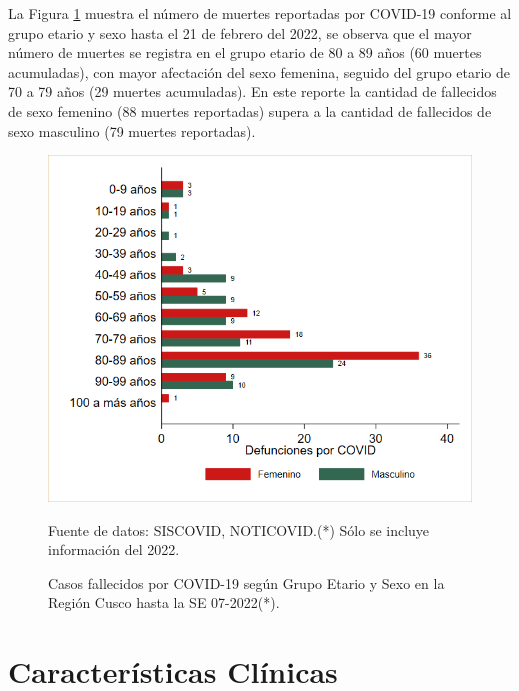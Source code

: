\documentclass[12pt,a4paper,openany]{book}
\begin{document}
La Figura \ref{fig:fallecidos_edad_sexo}  muestra el número de muertes reportadas por COVID-19 conforme al grupo etario y sexo hasta el 21 de febrero del 2022, se observa que el mayor número de muertes se registra en el grupo etario de 80 a 89 años (60 muertes acumuladas), con mayor afectación del sexo femenina, seguido del grupo etario de 70 a 79 años (29 muertes acumuladas). En este reporte la cantidad de fallecidos de sexo femenino (88 muertes reportadas) supera a la cantidad de fallecidos de sexo masculino (79 muertes reportadas). 

\begin{figure}[h]
	\caption{Casos fallecidos por COVID-19 según Grupo Etario y Sexo en la Región Cusco hasta la SE 07-2022(*).}\label{fig:fallecidos_edad_sexo}
	\begin{center}
		\includegraphics[width=0.75\linewidth]{../figuras/defunciones_etapavida_2022}
	\end{center}
	{\footnotesize {Fuente de datos: SISCOVID, NOTICOVID.(*) Sólo se incluye información del 2022.}}
\end{figure}



\cleardoublepage


\clearpage

\section*{Características Clínicas}
\end{document}
